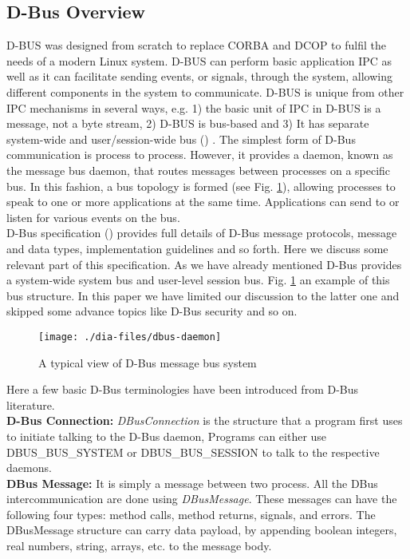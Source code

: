 \subsection*{D-Bus Overview}
D-BUS was designed from scratch to replace CORBA and DCOP  to fulfil the needs of a modern Linux system. D-BUS can perform basic application IPC as well as it can facilitate sending events, or signals, through the system, allowing different components in the system to communicate. D-BUS is unique from other IPC mechanisms in several ways, e.g. 1) the basic unit of IPC in D-BUS is a message, not a byte stream, 2) D-BUS is bus-based and 3) It has separate system-wide and user/session-wide bus (\cite{Love2005}) . The simplest form of D-Bus communication is process to process. However, it provides a daemon, known as the message bus daemon, that routes messages between processes on a specific bus. In this fashion, a bus topology is formed (see Fig. \ref{fig:dbus-daemon}), allowing processes to speak to one or more applications at the same time. Applications can send to or listen for various events on the bus.\\
D-Bus specification (\cite{Pennington+2010}) provides full details of D-Bus message protocols, message and data types, implementation guidelines and so forth. Here we discuss some relevant part of this specification. As we have already mentioned D-Bus provides a system-wide system bus and user-level session bus. Fig. \ref{fig:dbus-daemon} an example of this bus structure. In this paper we have limited our discussion to the latter one and skipped some advance topics like D-Bus security and so on.
\begin{figure}
\begin{center}
\texttt{[image: ./dia-files/dbus-daemon]} %
\caption{A typical view of D-Bus message bus system } 
\label{fig:dbus-daemon}
\end{center}
\end{figure}
Here a few basic D-Bus terminologies have been introduced from D-Bus literature.\\
\textbf{D-Bus Connection: }
\textit{DBusConnection} is the structure that a program first uses to initiate talking to the D-Bus daemon, Programs can either use DBUS\_BUS\_SYSTEM or DBUS\_BUS\_SESSION to talk to the respective daemons.\\
\textbf{DBus Message: }
It is simply a message between two process. All the DBus intercommunication are done using \textit{DBusMessage}. These messages can have the following four types: method calls, method returns, signals, and errors. The DBusMessage structure can carry data payload, by appending boolean integers, real numbers, string, arrays, etc. to the message body.\\ 
